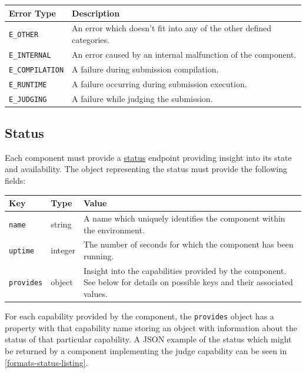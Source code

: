 \documentclass[11pt,letterpaper]{article}
\begin{document}
\nopagebreak
\begin{tabulary}{\textwidth}{ | l | L | }
    \hline
    \textbf{Error Type} & \textbf{Description} \\
    \hline
    \texttt{E\_OTHER} & An error which doesn't fit into any of the other
        defined categories. \\
    \hline
    \texttt{E\_INTERNAL} & An error caused by an internal malfunction of the
        component. \\
    \hline
    \texttt{E\_COMPILATION} & A failure during submission compilation. \\
    \hline
    \texttt{E\_RUNTIME} & A failure occurring during submission execution. \\
    \hline
    \texttt{E\_JUDGING} & A failure while judging the submission. \\
    \hline
\end{tabulary}

\subsection{Status}
\label{formats-status}

Each component must provide a \hyperref[endpoints-common]{status} endpoint
providing insight into its state and availability. The object representing the
status must provide the following fields:

\nopagebreak
\begin{tabulary}{\textwidth}{ | l | l | L | }
    \hline
    \textbf{Key} & \textbf{Type} & \textbf{Value} \\
    \hline
    \texttt{name} & string & A name which uniquely identifies the component
        within the environment. \\
    \hline
    \texttt{uptime} & integer & The number of seconds for which the component
        has been running. \\
    \hline
    \texttt{provides} & object & Insight into the capabilities provided by the
        component. See below for details on possible keys and their associated
        values. \\
    \hline
\end{tabulary}

For each capability provided by the component, the \texttt{provides} object has
a property with that capability name storing an object with information about
the status of that particular capability. A JSON example of the status which
might be returned by a component implementing the judge capability can be seen
in \autoref{formats-status-listing}.
\end{document}
